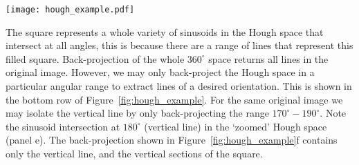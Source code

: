 \begin{sidewaysfigure}
\centering
\texttt{[image: hough\_example.pdf]}
\caption[Example Hough Transform]{(a) An image with a number of lines of varying orientation and intensity. (b) The Hough transform of the image in $(r, \theta)$ space. The multiple intersection points at $90^{\circ}$ and a variety of radii correspond to the multiple horizontal lines in the original image. There are also intersection points at $135^{\circ}$ (diagonal line in original image) and $180^{\circ}$ (vertical) line. (c) The back projected Hough transform, recovering all features in the original image. The bottom row (d)-(f) show the same as the top row, expect that the back-projection is chosen over a region in hough space that only contains the vertical line. In this way only the vertical line is recovered and the remaining features are not recovered.}
\label{fig:hough_example}
\end{sidewaysfigure}
The square represents a whole variety of sinusoids in the Hough space that intersect at all angles, this is because there are a range of lines that represent this filled square. Back-projection of the whole $360^{\circ}$ space returns all lines in the original image. However, we may only back-project the Hough space in a particular angular range to extract lines of a desired orientation. This is shown in the bottom row of Figure~\ref{fig:hough_example}. For the same original image we may isolate the vertical line by only back-projecting the range $170^{\circ}-190^{\circ}$. Note the sinusoid intersection at $180^{\circ}$ (vertical line) in the `zoomed' Hough space (panel e). The back-projection shown in Figure~\ref{fig:hough_example}f contains only the vertical line, and the vertical sections of the square.
%

